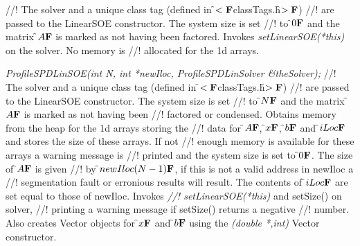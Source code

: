 \indent{}
\indent{}
\indent{}
\indent{}
\indent{}
\indent{}
\indent{}
\indent{}
\indent{}
\indent{}
\indent{}
\indent{}
\indent{}
\indent{}
\indent{}
\indent{}
\indent{}
\indent{}
\indent{} 
\indent{} 

//! The \p solver and a unique class tag (defined in \f$<{\bf F}$classTags.h\f$>{\bf F}$)
//! are passed to the LinearSOE constructor. The system size is set
//! to \f$0{\bf F}$ and the matrix \f$A{\bf F}$ is marked as not having been factored. Invokes
{\em setLinearSOE(*this)} on the \p solver. No memory is
//! allocated for the 1d arrays.  


{\em ProfileSPDLinSOE(int N, int *newIloc,
		  ProfileSPDLinSolver \&theSolver); }
//! The \p solver and a unique class tag (defined in \f$<{\bf F}$classTags.h\f$>{\bf F}$)
//! are passed to the LinearSOE constructor. The system size is set
//! to \f$N{\bf F}$ and the matrix \f$A{\bf F}$ is marked as not having been
//! factored or condensed. Obtains memory from the heap for the 1d arrays storing the
//! data for \f$A{\bf F}$, \f$x{\bf F}$, \f$b{\bf F}$ and \f$iLoc{\bf F}$ and stores the size of these arrays. If not
//! enough memory is available for these arrays a warning message is
//! printed and the system size is set to \f$0{\bf F}$. The size of \f$A{\bf F}$ is given
//! by \f$newIloc(N-1){\bf F}$, if this is not a valid address in \p newIloc a
//! segmentation fault or erronious results will result. The contents of
\f$iLoc{\bf F}$ are set equal to those of \p newIloc. Invokes {\em
//! setLinearSOE(*this)} and setSize() on \p solver,
//! printing a warning message if setSize() returns a negative
//! number. Also creates Vector objects for \f$x{\bf F}$ and \f$b{\bf F}$ using the {\em
(double *,int)} Vector constructor.

